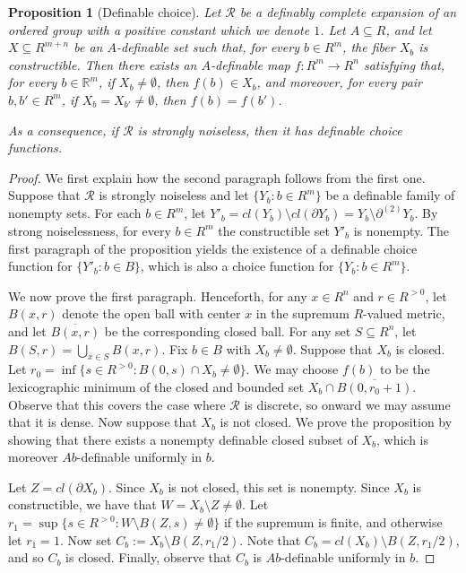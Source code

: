 \documentclass[12pt]{article}
\newcommand{\Rr}{\mathcal{R}}
\newcommand{\R}{\mathbb{R}}
\newcommand{\partn}[1]{\partial^{(#1)}}
\newtheorem{proposition}[theorem]{Proposition}
\theoremstyle{definition}
\theoremstyle{remark}
\begin{document}
\begin{proposition}[Definable choice]\label{prop:choice}
Let $\Rr$ be a definably complete expansion of an ordered group with a positive constant which we denote $1$. Let $A\subseteq R$, and let $X\subseteq R^{m+n}$ be an $A$-definable set such that, for every $b\in R^m$, the fiber $X_b$ is constructible. Then there exists an $A$-definable map $f:R^m\rightarrow R^n$ satisfying that, for every $b\in \R^m$, if $X_b\neq \emptyset$, then $f(b)\in X_b$, and moreover, for every pair $b,b'\in R^m$, if $X_b = X_{b'}\neq \emptyset$, then $f(b)=f(b')$.  

As a consequence, if $\Rr$ is strongly noiseless, then it has definable choice functions. 
\end{proposition}
\begin{proof}
We first explain how the second paragraph follows from the first one. Suppose that $\Rr$ is strongly noiseless and let $\{ Y_b : b\in R^m\}$ be a definable family of nonempty sets. For each $b\in R^m$, let $Y'_b = cl(Y_b)\setminus cl(\partial Y_b) = Y_b \setminus \partn{2}Y_b$. By strong noiselessness, for every $b\in R^m$ the constructible set $Y'_b$ is nonempty. The first paragraph of the proposition yields the existence of a definable choice function for $\{ Y'_b : b\in B\}$, which is also a choice function for $\{ Y_b : b\in R^m\}$. 

We now prove the first paragraph. Henceforth, for any $x\in R^n$ and $r\in R^{>0}$, let $B(x,r)$ denote the open ball with center $x$ in the supremum $R$-valued metric, and let $\overline{B(x,r)}$ be the corresponding closed ball. For any set $S\subseteq R^n$, let $B(S,r)=\bigcup_{x\in S} B(x,r)$. Fix $b\in B$ with $X_b\neq \emptyset$. Suppose that $X_b$ is closed. Let $r_0=\inf \{ s\in R^{>0} : B(0,s) \cap X_b \neq \emptyset\}$. We may choose $f(b)$ to be the lexicographic minimum of the closed and bounded set $X_b \cap \overline{B(0,r_0 + 1)}$. Observe that this covers the case where $\Rr$ is discrete, so onward we may assume that it is dense. Now suppose that $X_b$ is not closed. We prove the proposition by showing that there exists a nonempty definable closed subset of $X_b$, which is moreover $Ab$-definable uniformly in $b$. 

Let $Z=cl(\partial X_b)$. Since $X_b$ is not closed, this set is nonempty. Since $X_b$ is constructible, we have that $W=X_b \setminus Z \neq \emptyset$. Let $r_1=\sup\{ s \in R^{>0} : W\setminus B(Z,s) \neq\emptyset\}$ if the supremum is finite, and otherwise let $r_1=1$. Now set $C_b:=X_b \setminus B(Z,r_1/2)$. Note that $C_b = cl(X_b)\setminus B(Z,r_1/2)$, and so $C_b$ is closed. Finally, observe that $C_b$ is $Ab$-definable uniformly in $b$. 
\end{proof}
\end{document}
